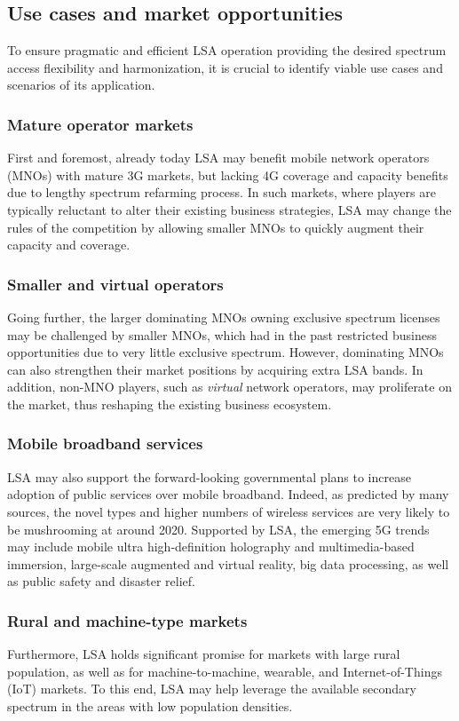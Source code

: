 \documentclass[journal]{IEEEtran}
\begin{document}
\subsection{Use cases and market opportunities}

To ensure pragmatic and efficient LSA operation providing the desired spectrum access flexibility and harmonization, it is crucial to identify viable use cases and scenarios of its application. 

\subsubsection{Mature operator markets} First and foremost, already today LSA may benefit mobile network operators (MNOs) with mature 3G markets, but lacking 4G coverage and capacity benefits due to lengthy spectrum refarming process. In such markets, where players are typically reluctant to alter their existing business strategies, LSA may change the rules of the competition by allowing smaller MNOs to quickly augment their capacity and coverage. 

\subsubsection{Smaller and virtual operators} Going further, the larger dominating MNOs owning exclusive spectrum licenses may be challenged by smaller MNOs, which had in the past restricted business opportunities due to very little exclusive spectrum. However, dominating MNOs can also strengthen their market positions by acquiring extra LSA bands. In addition, non-MNO players, such as \textit{virtual} network operators, may proliferate on the market, thus reshaping the existing business ecosystem.

\subsubsection{Mobile broadband services} LSA may also support the forward-looking governmental plans to increase adoption of public services over mobile broadband. Indeed, as predicted by many sources, the novel types and higher numbers of wireless services are very likely to be mushrooming at around 2020. Supported by LSA, the emerging 5G trends may include mobile ultra high-definition holography and multimedia-based immersion, large-scale augmented and virtual reality, big data processing, as well as public safety and disaster relief.

\subsubsection{Rural and machine-type markets} Furthermore, LSA holds significant promise for markets with large rural population, as well as for machine-to-machine, wearable, and Internet-of-Things (IoT) markets. To this end, LSA may help leverage the available secondary spectrum in the areas with low population densities. 
\end{document}
